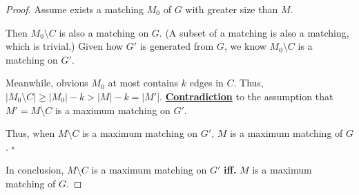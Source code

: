 \documentclass{article}
\newcommand{\whiteqed}{\hfill $\square$\par}
\begin{document}
\begin{proof}
    \hspace{1.3em}
    Assume exists a matching $M_0$ of $G$ with greater size than $M$. 
    
    \hspace{1.3em}
    Then $M_0\setminus C$ is also a matching on $G$. (A subset of a matching is also a matching, which is trivial.) Given how $G'$ is generated from $G$, we know $M_0\setminus C$ is a matching on $G'$.
    
    \hspace{1.3em}
    Meanwhile, obvious $M_0$ at most contains $k$ edges in $C$. Thus, 
    $|M_0\setminus C|\geq|M_0|-k>|M|-k=|M'|$. \underline{\textbf{Contradiction}} to the assumption that $M'=M\setminus C$ is a maximum matching on $G'$.
    
    \hspace{1.3em}
    Thus, when $M\setminus C$ is a maximum matching on $G'$, $M$ is a maximum matching of $G$. \whiteqed
    
    \vspace{1.5em} \hspace{1.3em}
    In conclusion, $M\setminus C$ is a maximum matching on $G'$ \textbf{iff.} $M$ is a maximum matching of $G$.
\end{proof}

\vspace{1em}
\end{document}
